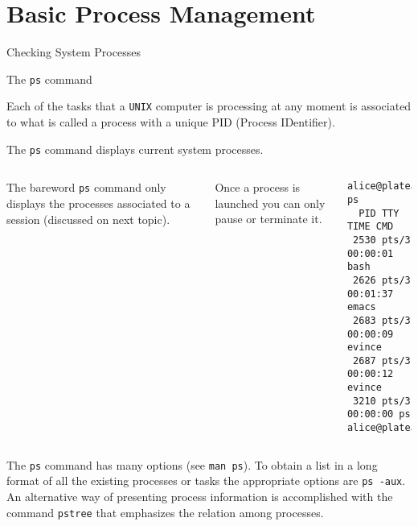 \section{Basic Process Management}
\begin{frame}[t,fragile]{Checking System Processes}


  \begin{block}{The \alert{\texttt{ps}} command}
    {\footnotesize
 Each of the tasks that a \texttt{UNIX} computer is processing
  at any moment is associated to what is called a \alert{process}
  with a unique \alert{PID} (Process IDentifier).

  The \texttt{ps} command displays current system processes. 

    }

  {\scriptsize

  \begin{columns}
      The bareword \texttt{ps} command only displays the 
  processes associated to a session (discussed
  on next topic).

  Once a process is launched you can only pause or terminate it.
        \hspace{-3cm}
        \begin{lstlisting}
alice@platea:~$ ps
  PID TTY          TIME CMD
 2530 pts/3    00:00:01 bash
 2626 pts/3    00:01:37 emacs
 2683 pts/3    00:00:09 evince
 2687 pts/3    00:00:12 evince
 3210 pts/3    00:00:00 ps
alice@platea:~$ 
        \end{lstlisting}
    \end{columns}
  }
  {\footnotesize
      The \alert{\texttt{ps}} command has many options (see
  \texttt{man ps}). To
  obtain a list in a long format of all the existing processes or
  tasks the appropriate options are \alert{\texttt{ps -aux}}. An alternative way
  of presenting process information is accomplished with the command
  \texttt{pstree} that emphasizes the relation among processes.
}
  \end{block}
  
\end{frame}

